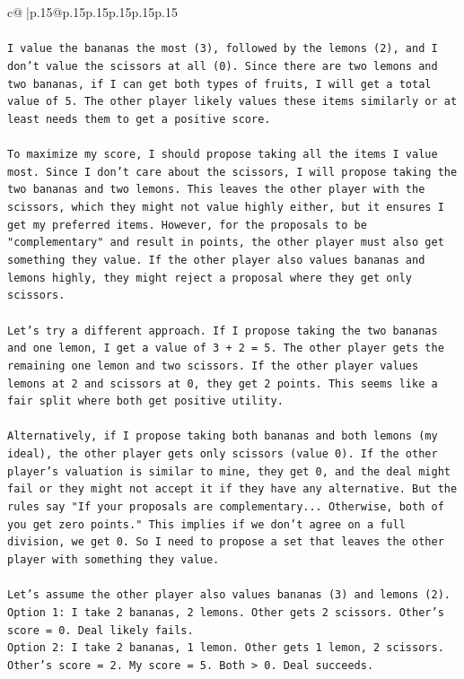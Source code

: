 \documentclass{article}
\begin{document}
{\begin{supertabular}{c@{$\;$}|p{.15\linewidth}@{}p{.15\linewidth}p{.15\linewidth}p{.15\linewidth}p{.15\linewidth}p{.15\linewidth}}
{{{\\ 
\\ 
\texttt{I value the bananas the most (3), followed by the lemons (2), and I don't value the scissors at all (0). Since there are two lemons and two bananas, if I can get both types of fruits, I will get a total value of 5. The other player likely values these items similarly or at least needs them to get a positive score.} \\
\\ 
\texttt{To maximize my score, I should propose taking all the items I value most. Since I don't care about the scissors, I will propose taking the two bananas and two lemons. This leaves the other player with the scissors, which they might not value highly either, but it ensures I get my preferred items. However, for the proposals to be "complementary" and result in points, the other player must also get something they value. If the other player also values bananas and lemons highly, they might reject a proposal where they get only scissors.} \\
\\ 
\texttt{Let's try a different approach. If I propose taking the two bananas and one lemon, I get a value of 3 + 2 = 5. The other player gets the remaining one lemon and two scissors. If the other player values lemons at 2 and scissors at 0, they get 2 points. This seems like a fair split where both get positive utility.} \\
\\ 
\texttt{Alternatively, if I propose taking both bananas and both lemons (my ideal), the other player gets only scissors (value 0). If the other player's valuation is similar to mine, they get 0, and the deal might fail or they might not accept it if they have any alternative. But the rules say "If your proposals are complementary... Otherwise, both of you get zero points." This implies if we don't agree on a full division, we get 0. So I need to propose a set that leaves the other player with something they value.} \\
\\ 
\texttt{Let's assume the other player also values bananas (3) and lemons (2).} \\
\texttt{Option 1: I take 2 bananas, 2 lemons. Other gets 2 scissors. Other's score = 0. Deal likely fails.} \\
\texttt{Option 2: I take 2 bananas, 1 lemon. Other gets 1 lemon, 2 scissors. Other's score = 2. My score = 5. Both > 0. Deal succeeds.} \\
}}}
\end{supertabular}}
\end{document}
